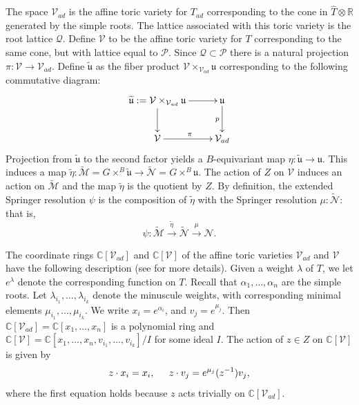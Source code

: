 \documentclass[reqno,11pt]{amsart}
\theoremstyle{remark}
\theoremstyle{remark}
\theoremstyle{definition}
\theoremstyle{definition}
\theoremstyle{definition}
\numberwithin{equation}{section}
\newcommand{\R}{\mathbb{ R}}           %
\newcommand{\C}{\mathbb{C}}           %
\newcommand{\fu}{{\mathfrak u}}
\newcommand{\ga}{\alpha}
\newcommand{\gl}{\lambda}
\newcommand{\cm}{\mathcal{M}}
\newcommand{\cn}{\mathcal{N}}
\newcommand{\cp}{\mathcal{P}}
\newcommand{\cq}{\mathcal{Q}}
\newcommand{\toric}{\mathcal{V}}
\renewcommand{\tilde}{\widetilde}
\renewcommand{\hat}{\widehat}
\begin{document}
The space $\toric_{ad}$ is the affine toric variety for $T_{ad}$ corresponding to the cone in $\hat{T} \otimes \R$ generated by the simple roots.  The lattice associated with this toric variety is the root lattice $\cq$.  
Define $\toric$ to be the affine toric variety for $T$ corresponding to the same cone, but with lattice equal to $\cp$.  
Since $\cq\subset \cp$ there is a natural projection $\pi:\toric \to \toric_{ad}$.   
Define $\tilde{\fu}$ as the fiber product $\toric\times_{\toric_{ad}} \fu$ corresponding to the following commutative diagram:
\[
\xymatrix{
 \tilde{\fu}:= \toric\times_{\toric_{ad}} \fu \ar[r]\ar[d]& \fu \ar[d]_p \\ 
 \toric \ar[r]^\pi & \toric_{ad} }
\]
Projection from $\tilde{\fu}$ to the second factor yields a $B$-equivariant map $\eta: \tilde{\fu} \to \fu$.  This induces a map $\tilde{\eta}: \tilde{\cm} = G \times^B \tilde{\fu} \to \tilde{\cn} = G \times^B \fu$.
The action of $Z$ on $\toric$ induces an action on $\tilde{\cm}$ and the map $\tilde{\eta}$
is the quotient by $Z$.  By definition, the extended Springer resolution $\psi$ is the composition of $\tilde{\eta}$ with the Springer resolution $\mu: \tilde{\cn}$: that is,
\begin{equation} \label{e:extended}
\psi: \tilde{\cm} \stackrel{\tilde{\eta}}{\longrightarrow} \tilde{\cn} \stackrel{\mu}{\longrightarrow} \cn.
\end{equation}


The coordinate rings $\C[\toric_{ad}]$ and $\C[\toric]$ of the affine toric varieties $\toric_{ad}$ and $\toric$ have the following description (see \cite[\S 3.1]{GPR23} for more details). Given a weight $\lambda$ of $T$, we let $e^{\gl}$ denote the corresponding function on $T$. Recall that $\ga_1, \ldots, \ga_n$ are the simple roots.  Let $\gl_{i_1}, \ldots, \gl_{i_k}$ denote the minuscule weights, with corresponding minimal elements $\mu_{i_1}, \ldots, \mu_{i_k}$. We write $x_i = e^{\ga_i}$, and $v_j = e^{\mu_j}$.  Then $\C[\toric_{ad}] = \C[x_1, \ldots, x_n]$ is a polynomial ring and  $\C[\toric] =  \C[x_1, \ldots, x_n, v_{i_1}, \ldots, v_{i_k}]/I$ for some ideal $I$.  The action of $z \in Z$ on $\C[\toric]$ is given by
\begin{equation} \label{e:zaction}
z \cdot x_i = x_i, \hspace{.2in} z \cdot v_j = e^{\mu_j}(z^{-1}) v_j,
\end{equation}
where the first equation holds because $z$ acts trivially on $\C[\toric_{ad}] $.
\end{document}
